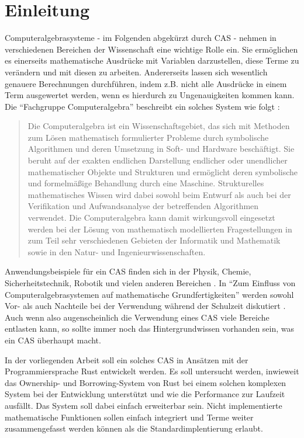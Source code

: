 \documentclass[11pt,a4paper, ngerman]{article}
\begin{document}
\section{Einleitung}
Computeralgebrasysteme - im Folgenden abgekürzt durch CAS - nehmen in verschiedenen Bereichen der Wissenschaft eine wichtige Rolle ein. Sie ermöglichen es einerseits mathematische Ausdrücke mit Variablen darzustellen, diese Terme zu verändern und mit diesen zu arbeiten. Andererseits lassen sich wesentlich genauere Berechnungen durchführen, indem z.B. nicht alle Ausdrücke in einem Term ausgewertet werden, wenn es hierdurch zu Ungenauigkeiten kommen kann. Die ``Fachgruppe Computeralgebra'' beschreibt ein solches System wie folgt \cite{FachgruppeDef}:
\begin{quote}
    Die Computeralgebra ist ein Wissenschaftsgebiet, das sich mit Methoden zum Lösen mathematisch formulierter Probleme durch symbolische Algorithmen und deren Umsetzung in Soft- und Hardware beschäftigt. Sie beruht auf der exakten endlichen Darstellung endlicher oder unendlicher mathematischer Objekte und Strukturen und ermöglicht deren symbolische und formelmäßige Behandlung durch eine Maschine. Strukturelles mathematisches Wissen wird dabei sowohl beim Entwurf als auch bei der Verifikation und Aufwandsanalyse der betreffenden Algorithmen verwendet. Die Computeralgebra kann damit wirkungsvoll eingesetzt werden bei der Lösung von mathematisch modellierten Fragestellungen in zum Teil sehr verschiedenen Gebieten der Informatik und Mathematik sowie in den Natur- und Ingenieurwissenschaften.
\end{quote}

Anwendungsbeispiele für ein CAS finden sich in der Physik, Chemie, Sicherheitstechnik, Robotik und vielen anderen Bereichen \cite{FachgruppeEinsatz}. In ``Zum Einfluss von Computeralgebrasystemen auf mathematische Grundfertigkeiten'' werden sowohl Vor- als auch Nachteile bei der Verwendung während der Schulzeit diskutiert \cite[S. 17 ff.]{RN18}. Auch wenn also augenscheinlich die Verwendung eines CAS viele Bereiche entlasten kann, so sollte immer noch das Hintergrundwissen vorhanden sein, was ein CAS überhaupt macht.

In der vorliegenden Arbeit soll ein solches CAS in Ansätzen mit der Programmiersprache Rust entwickelt werden. Es soll untersucht werden, inwieweit das Ownership- und Borrowing-System von Rust bei einem solchen komplexen System bei der Entwicklung unterstützt und wie die Performance zur Laufzeit ausfällt. Das System soll dabei einfach erweiterbar sein. Nicht implementierte mathematische Funktionen sollen einfach integriert und Terme weiter zusammengefasst werden können als die Standardimplentierung erlaubt.
\end{document}
